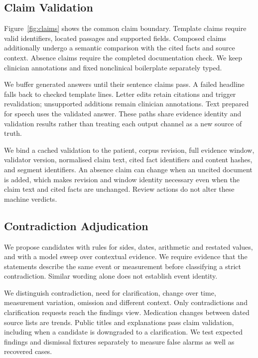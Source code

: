 \documentclass[10pt]{article}
\begin{document}
\subsection{Claim Validation}
Figure~\ref{fig:claims} shows the common claim boundary. Template claims require
valid identifiers, located passages and supported fields. Composed claims additionally
undergo a semantic comparison with the cited facts and source context. Absence claims
require the completed documentation check. We keep clinician annotations and fixed
nonclinical boilerplate separately typed.


We buffer generated answers until their sentence claims pass. A failed headline
falls back to checked template lines. Letter edits retain citations and trigger
revalidation; unsupported additions remain clinician annotations. Text prepared for
speech uses the validated answer. These paths share evidence identity and validation
results rather than treating each output channel as a new source of truth.

We bind a cached validation to the patient, corpus revision, full evidence window,
validator version, normalised claim text, cited fact identifiers and content hashes,
and segment identifiers. An absence claim can change when an uncited document is
added, which makes revision and window identity necessary even when the claim text
and cited facts are unchanged. Review actions do not alter these machine verdicts.

\subsection{Contradiction Adjudication}
We propose candidates with rules for sides, dates, arithmetic and restated values,
and with a model sweep over contextual evidence. We require evidence that the
statements describe the same event or measurement before classifying a strict
contradiction. Similar wording alone does not establish event identity.

We distinguish contradiction, need for clarification, change over time, measurement
variation, omission and different context. Only contradictions and clarification
requests reach the findings view. Medication changes between dated source lists are
trends. Public titles and explanations pass claim validation, including when a
candidate is downgraded to a clarification. We test expected findings and dismissal
fixtures separately to measure false alarms as well as recovered cases.
\end{document}
